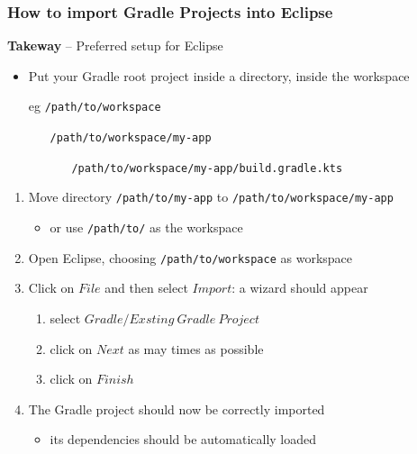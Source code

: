 \documentclass[presentation]{beamer}\mode<presentation>{\usetheme{AMSBolognaFC}}
\begin{document}
\begin{frame}[c,allowframebreaks]
	\frametitle{How to import Gradle Projects into Eclipse}

	\begin{block}{\textbf{Takeway} -- Preferred setup for Eclipse}
		\begin{itemize}
			\item Put your Gradle root project inside a directory, inside the \alert{workspace}
			\item[eg] \texttt{/path/to/workspace}
			\begin{itemize}
				\item[] \texttt{/path/to/workspace/\alert{my-app}}
				\begin{itemize}
					\item[] \texttt{/path/to/workspace/my-app/\alert{build.gradle.kts}}
				\end{itemize}
			\end{itemize}
		\end{itemize}
	\end{block}

	\framebreak

	\begin{enumerate}
		\item Move directory \texttt{/path/to/\alert{my-app}} to \texttt{/path/to/\alert{workspace}/my-app}
        \begin{itemize}
            \item or use \texttt{/path/\alert{to/}} as the workspace
        \end{itemize}

		\medskip

		\item Open Eclipse, choosing \texttt{/path/to/\alert{workspace}} as workspace

		\medskip

		\item Click on $File$ and then select $Import$: a wizard should appear
		\begin{enumerate}
			\item select $Gradle / Exsting\ Gradle\ Project$
			\item click on $Next$ as may times as possible
			\item click on $Finish$
		\end{enumerate}

		\medskip

		\item The Gradle project should now be correctly imported
		\begin{itemize}
			\item its dependencies should be automatically loaded
		\end{itemize}


\end{enumerate}
\end{frame}
\end{document}
